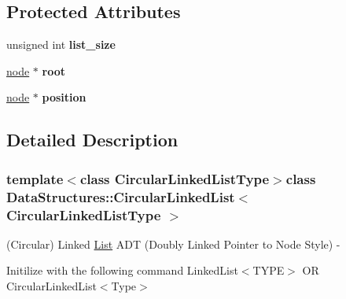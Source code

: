\subsection*{Protected Attributes}
\begin{DoxyCompactItemize}
\item 
\hypertarget{class_data_structures_1_1_circular_linked_list_a1f553549888450de0fe8302facda16fe}{unsigned int {\bfseries list\-\_\-size}}\label{class_data_structures_1_1_circular_linked_list_a1f553549888450de0fe8302facda16fe}

\item 
\hypertarget{class_data_structures_1_1_circular_linked_list_aefbf7b5e06902907f5663f88bb7c646a}{\hyperlink{struct_data_structures_1_1_circular_linked_list_1_1node}{node} $\ast$ {\bfseries root}}\label{class_data_structures_1_1_circular_linked_list_aefbf7b5e06902907f5663f88bb7c646a}

\item 
\hypertarget{class_data_structures_1_1_circular_linked_list_af465832a55530fe55425f2b6e5015ad2}{\hyperlink{struct_data_structures_1_1_circular_linked_list_1_1node}{node} $\ast$ {\bfseries position}}\label{class_data_structures_1_1_circular_linked_list_af465832a55530fe55425f2b6e5015ad2}

\end{DoxyCompactItemize}


\subsection{Detailed Description}
\subsubsection*{template$<$class Circular\-Linked\-List\-Type$>$class Data\-Structures\-::\-Circular\-Linked\-List$<$ Circular\-Linked\-List\-Type $>$}

(Circular) Linked \hyperlink{class_data_structures_1_1_list}{List} A\-D\-T (Doubly Linked Pointer to Node Style) -\/ 

Initilize with the following command Linked\-List$<$\-T\-Y\-P\-E$>$ O\-R Circular\-Linked\-List$<$\-Type$>$

